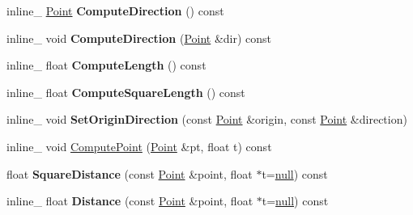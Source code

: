 \begin{DoxyCompactItemize}
\item 
inline\+\_\+ \hyperlink{classPoint}{Point} {\bfseries Compute\+Direction} () const \hypertarget{classSegment_ab16c46daff4a7968e93961c1463cb721}{}\label{classSegment_ab16c46daff4a7968e93961c1463cb721}

\item 
inline\+\_\+ void {\bfseries Compute\+Direction} (\hyperlink{classPoint}{Point} \&dir) const \hypertarget{classSegment_a655a68b2dbb98b0fb88852744075d8e5}{}\label{classSegment_a655a68b2dbb98b0fb88852744075d8e5}

\item 
inline\+\_\+ float {\bfseries Compute\+Length} () const \hypertarget{classSegment_ab1e8818ec363cb591a644e271d29810b}{}\label{classSegment_ab1e8818ec363cb591a644e271d29810b}

\item 
inline\+\_\+ float {\bfseries Compute\+Square\+Length} () const \hypertarget{classSegment_a23f96f91da3b70a5df97743e565d8ec7}{}\label{classSegment_a23f96f91da3b70a5df97743e565d8ec7}

\item 
inline\+\_\+ void {\bfseries Set\+Origin\+Direction} (const \hyperlink{classPoint}{Point} \&origin, const \hyperlink{classPoint}{Point} \&direction)\hypertarget{classSegment_a5125897eff3e07e5df4e4c5c98a4910e}{}\label{classSegment_a5125897eff3e07e5df4e4c5c98a4910e}

\item 
inline\+\_\+ void \hyperlink{classSegment_a45b255d4ad881d40bbe924e38d49368b}{Compute\+Point} (\hyperlink{classPoint}{Point} \&pt, float t) const 
\item 
float {\bfseries Square\+Distance} (const \hyperlink{classPoint}{Point} \&point, float $\ast$t=\hyperlink{IceTypes_8h_ac97b8ee753e4405397a42ad5799b0f9e}{null}) const \hypertarget{classSegment_adaac64662e3b372e393181b8de576a44}{}\label{classSegment_adaac64662e3b372e393181b8de576a44}

\item 
inline\+\_\+ float {\bfseries Distance} (const \hyperlink{classPoint}{Point} \&point, float $\ast$t=\hyperlink{IceTypes_8h_ac97b8ee753e4405397a42ad5799b0f9e}{null}) const \hypertarget{classSegment_a9143629d69ca029c3062916440e7b854}{}\label{classSegment_a9143629d69ca029c3062916440e7b854}

\end{DoxyCompactItemize}
